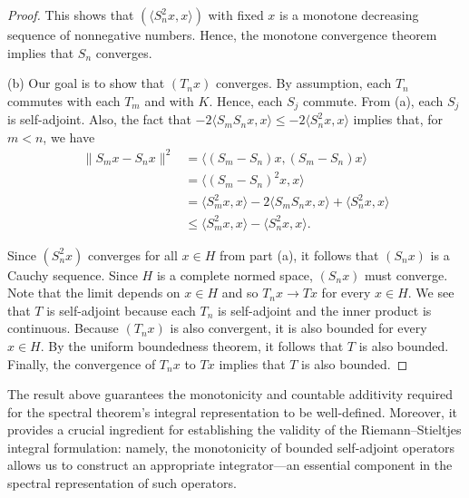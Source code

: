 \begin{proof}
This shows that \( (\langle {S}_{n}^{2} x  , x  \rangle) \) with fixed \( x  \) is a monotone decreasing sequence of nonnegative numbers. Hence, the monotone convergence theorem implies that \( {S}_{n} \) converges. 

(b) Our goal is to show that \( ({T}_{n}x) \) converges. By assumption, each \( {T}_{n} \) commutes with each \( {T}_{m} \) and with \( K  \). Hence, each \( {S}_{j} \) commute. From (a), each \( {S}_{j} \) is self-adjoint. Also, the fact that \( -2 \langle {S}_{m} {S}_{n} x  ,  x  \rangle \leq -2 \langle {S}_{n}^{2} x  ,  x  \rangle \) implies that, for \( m < n  \), we have 
\begin{align*}
    \|{S}_{m} x - {S}_{n}x  \|^{2} &= \langle ({S}_{m} -{S}_{n}) x  , ({S}_{m} - {S}_{n}) x  \rangle \\
                                   &= \langle ({S}_{m} - {S}_{n})^{2} x  ,  x  \rangle \\
                                   &= \langle {S}_{m}^{2} x  ,  x  \rangle - 2 \langle {S}_{m}{S}_{n} x  ,  x  \rangle + \langle {S}_{n}^{2} x   , x    \rangle \\
                                   &\leq \langle {S}_{m}^{2} x  ,  x  \rangle - \langle {S}_{n}^{2} x  ,  x  \rangle.
\end{align*}

Since \( ({S}_{n}^{2}x) \) converges for all \( x \in H  \) from part (a), it follows that \( ({S}_{n}x ) \) is a Cauchy sequence. Since \( H  \) is a complete normed space, \( ({S}_{n} x ) \) must converge. Note that the limit depends on \( x \in H  \) and so \( {T}_{n}x \to  Tx  \) for every \( x \in H  \). We see that \( T  \) is self-adjoint because each \( {T}_{n} \) is self-adjoint and the inner product is continuous. Because \( ({T}_{n}x) \) is also convergent, it is also bounded for every \( x \in H \). By the uniform boundedness theorem, it follows that \( T  \) is also bounded. Finally, the convergence of \( {T}_{n}x  \) to \(  Tx  \) implies that \( T  \) is also bounded.
\end{proof}

The result above guarantees the monotonicity and countable additivity required for the spectral theorem's integral representation to be well-defined. Moreover, it provides a crucial ingredient for establishing the validity of the Riemann–Stieltjes integral formulation: namely, the monotonicity of bounded self-adjoint operators allows us to construct an appropriate integrator—an essential component in the spectral representation of such operators.



